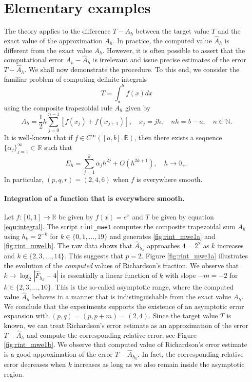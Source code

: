 \documentclass[runningheads]{llncs}
\begin{document}
\section{Elementary examples}

The theory applies to the difference $T - A_h$ between the target value $T$ and the exact value of the approximation $A_h$.
In practice, the computed value $\hat{A}_h$ is different from the exact value $A_h$. However, it is often possible to assert that the computational error $A_h - \hat{A}_h$ is irrelevant and issue precise estimates of the error $T - \hat{A}_h$. We shall now demonstrate the procedure. To this end, we consider the familiar problem of computing definite integrals
\begin{equation} \label{equ:integral}
  T = \int_{a}^b f(x) dx
\end{equation}
using the composite trapezoidal rule $A_h$ given by
\begin{equation}
  A_h = \frac{1}{2}h \sum_{j=0}^{n-1} \left[ f(x_j) + f(x_{j+1}) \right], \quad x_j = jh, \quad nh = b-a, \quad n \in \mathbb{N}.
\end{equation}
It is well-known that if $f \in C^{\infty}([a,b], \mathbb{R})$, then there exists a sequence $\{\alpha_j\}_{j=1}^\infty \subset \mathbb{R}$ such that 
\begin{equation} \label{equ:trapezoidal-rule:aex}
  E_h = \sum_{j=1}^k \alpha _j h^{2j} + O(h^{2k+1}), \quad h \rightarrow 0_+.
\end{equation}
In particular, $(p,q,r) = (2,4,6)$ when $f$ is everywhere smooth.
\paragraph{Integration of a function that is everywhere smooth.}

Let $f : [0, 1] \rightarrow \mathbb{R}$ be given by $f(x) = e^x$ and $T$ be given by equation \eqref{equ:integral}.
The script {\tt rint\_mwe1} computes the composite trapezoidal sum $A_h$ using $h_k = 2^{-k}$ for $k \in \{0,1,\dots,19\}$ and generates \ref{fig:rint_mwe1a} and \ref{fig:rint_mwe1b}.
The raw data shows that $\hat{A}_{h_k}$ approaches $4 = 2^2$ as $k$ increases and $k \in \{2,3,\dots,14\}$.
This suggests that $p=2$.
Figure \ref{fig:rint_mwe1a} illustrates the evolution of the \emph{computed} values of Richardson's fraction.
We observe that $k \rightarrow \log_2|\hat{F}_{h_k} - 4|$ is essentially a linear function of $k$ with slope $-m = -2$ for $k \in \{2,3,\dots,10\}$.
This is the so-called asymptotic range, where the computed value $\hat{A}_h$  behaves in a manner that is indistinguishable from the exact value $A_h$.
We conclude that the experiments supports the existence of an asymptotic error expansion with $(p,q) = (p,p+m) = (2,4)$.
Since the target value $T$ is known, we can treat Richardson's error estimate as an approximation of the error $T - \hat{A}_h$ and compute the corresponding relative error, see Figure \ref{fig:rint_mwe1b}.
We observe that computed value of Richardson's error estimate is a good approximation of the error $T - \hat{A}_{h_h}$. In fact, the corresponding relative error decreases when $k$ increases as long as we also remain inside the asymptotic region.
\end{document}
